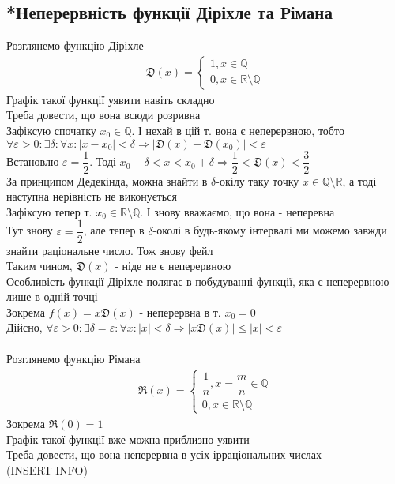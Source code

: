 \documentclass[a4paper, 14pt]{extarticle}
\def\bigline{\vspace{5mm}\\}
\def\bigline{\vspace{5mm}\\}
\begin{document}
\subsection{*Неперервність функції Діріхле та Рімана}
Розглянемо функцію Діріхле
\begin{align*}
\mathfrak{D}(x) = \begin{cases} 1, x \in \mathbb{Q} \\ 0, x \in \mathbb{R} \setminus \mathbb{Q} \end{cases}
\end{align*}
Графік такої функції уявити навіть складно\\
Треба довести, що вона всюди розривна\\
Зафіксую спочатку $x_0 \in \mathbb{Q}$. І нехай в цій т. вона є неперервною, тобто\\
$\forall \varepsilon > 0: \exists \delta: \forall x: |x-x_0|<\delta \Rightarrow |\mathfrak{D}(x)-\mathfrak{D}(x_0)| < \varepsilon$\\
Встановлю $\varepsilon = \dfrac{1}{2}$. Тоді $x_0 - \delta < x < x_0 + \delta \Rightarrow \dfrac{1}{2} < \mathfrak{D}(x) < \dfrac{3}{2}$\\
За принципом Дедекінда, можна знайти в $\delta$-окілу таку точку $x \in \mathbb{Q} \setminus \mathbb{R}$, а тоді наступна нерівність не виконується
\bigline
Зафіксую тепер т. $x_0 \in \mathbb{R} \setminus \mathbb{Q}$. І знову вважаємо, що вона - неперевна\\
Тут знову $\varepsilon = \dfrac{1}{2}$, але тепер в $\delta$-околі в будь-якому інтервалі ми можемо завжди знайти раціональне число. Тож знову фейл\\
Таким чином, $\mathfrak{D}(x)$ - ніде не є неперервною
\bigline
Особливість функції Діріхле полягає в побудуванні функції, яка є неперервною лише в одній точці\\
Зокрема $f(x) = x \mathfrak{D}(x)$ - неперервна в т. $x_0 = 0$\\
Дійсно, $\forall \varepsilon > 0: \exists \delta = \varepsilon: \forall x: |x| <\delta \Rightarrow |x \mathfrak{D}(x)| \leq |x| < \varepsilon$
\bigline
\bigline
Розглянемо функцію Рімана
\begin{align*}
\mathfrak{R}(x) = \begin{cases} \dfrac{1}{n}, x = \dfrac{m}{n} \in \mathbb{Q} \\ 0, x \in \mathbb{R} \setminus \mathbb{Q} \end{cases}
\end{align*}
Зокрема $\mathfrak{R}(0) = 1$\\
Графік такої функції вже можна приблизно уявити\\
Треба довести, що вона неперервна в усіх ірраціональних числах\\
(INSERT INFO)
\bigline
\end{document}
